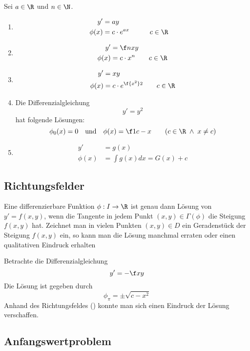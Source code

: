 \documentclass[a4paper,10pt]{scrbook}
\begin{document}
\begin{ex*}
	Sei $a \in \R$ und $n\in \N$.
	\begin{enumerate}[1)]
		\item
			\begin{alignat*}{3}
				y' &= ay\\ 
  \phi(x) &= c \cdot e^{ax} &&\qquad c\in \R
			\end{alignat*}
		\item
			\begin{align*}
				y' &= \f nx y \\
  \phi(x) &= c \cdot x^n \qquad c\in \R
			\end{align*}
		\item
			\begin{align*}
				y' &= xy \\
		   \phi(x) &= c \cdot e^{\f {x^2}2}  \qquad c\in \R
			\end{align*}
		\item
			Die Differenzialgleichung
			\[
				y' = y^2
			\]
			hat folgende Lösungen:
			\[
				\phi_0(x) = 0 \quad \text{und} \quad \phi(x)= \f 1{c-x} \qquad (c\in \R \;\land\; x\neq c)
			\]
		\item
			\begin{align*}
				y' &= g(x) \\
		   \phi(x) &= \int g(x) dx =  G(x) + c
			\end{align*}
	\end{enumerate}
\end{ex*}

\subsection{Richtungsfelder}

Eine differenzierbare Funktion $\phi:I\to \R$ ist genau dann Lösung von $y'=f(x,y)$, wenn die Tangente in jedem Punkt $(x,y)\in \Gamma(\phi)$ die Steigung $f(x,y)$ hat.
Zeichnet man in vielen Punkten $(x,y)\in D$ ein Geradenstück der Steigung $f(x,y)$ ein, so kann man die Lösung manchmal erraten oder einen qualitativen Eindruck erhalten

\begin{ex*}
	Betrachte die Differenzialgleichung
	\[
		y' = -\f xy
	\]
	Die Lösung ist gegeben durch
	\[
		\phi_\pi = \pm\sqrt{c-x^2}
	\]
	Anhand des Richtungsfeldes (\fixme[Graphik]) konnte man sich einen Eindruck der Lösung verschaffen. 
\end{ex*}

\subsection{Anfangswertproblem}
\end{document}
